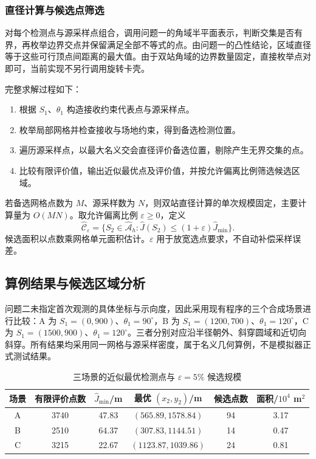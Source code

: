\subsubsection{直径计算与候选点筛选}

对每个检测点与源采样点组合，调用问题一的角域半平面表示，判断交集是否有界，再枚举边界交点并保留满足全部不等式的点。由问题一的凸性结论，区域直径等于这些可行顶点间距离的最大值。由于双站角域的边界数量固定，直接枚举点对即可，当前实现不另行调用旋转卡壳。

完整求解过程如下：
\begin{enumerate}[label=\arabic*)]
\item 根据 $S_1$、$\theta_1$ 构造接收约束代表点与源采样点。
\item 枚举局部网格并检查接收与场地约束，得到备选检测位置。
\item 遍历源采样点，以最大名义交会直径评价备选位置，剔除产生无界交集的点。
\item 比较有限评价值，输出近似最优点及评价值，并按允许偏离比例筛选候选区域。
\end{enumerate}
若备选网格点数为 $M$、源采样数为 $N$，则双站直径计算的单次规模固定，主要计算量为 $O(MN)$。取允许偏离比例 $\varepsilon\ge0$，定义
\begin{equation}\label{eq:p2-candidate}
\widehat{\mathcal C}_{\varepsilon}
=\{S_2\in\widehat{\mathcal A}_h:\widehat J(S_2)\le(1+\varepsilon)\widehat J_{\min}\}.
\end{equation}
候选面积以点数乘网格单元面积估计。$\varepsilon$ 用于放宽选点要求，不自动补偿采样误差。

\pTwoPageBreak
\subsection{算例结果与候选区域分析}

问题二未指定首次观测的具体坐标与示向度，因此采用现有程序的三个合成场景进行比较：A 为 $S_1=(0,900)$、$\theta_1=90^\circ$，B 为 $S_1=(1200,700)$、$\theta_1=120^\circ$，C 为 $S_1=(1500,900)$、$\theta_1=120^\circ$。三者分别对应沿半径朝外、斜穿圆域和近切向斜穿。所有结果均采用同一网格与源采样密度，属于名义几何算例，不是模拟器正式测试结果。

\begin{table}[H]
\centering\small
\caption{三场景的近似最优检测点与 $\varepsilon=5\%$ 候选规模}\label{tab:p2-best}
\begin{tabular}{cccccc}
\toprule
场景 & 有限评价点数 & $\widehat J_{\min}$/m & 最优 $(x_2,y_2)$/m & 候选点数 & 面积/$10^4$ m$^2$\\
\midrule
A & 3740 & 47.83 & $(565.89,1578.84)$ & 94 & 3.17\\
B & 2510 & 64.37 & $(307.83,1144.51)$ & 14 & 0.47\\
C & 3215 & 22.67 & $(1123.87,1039.86)$ & 24 & 0.81\\
\bottomrule
\end{tabular}
\end{table}


